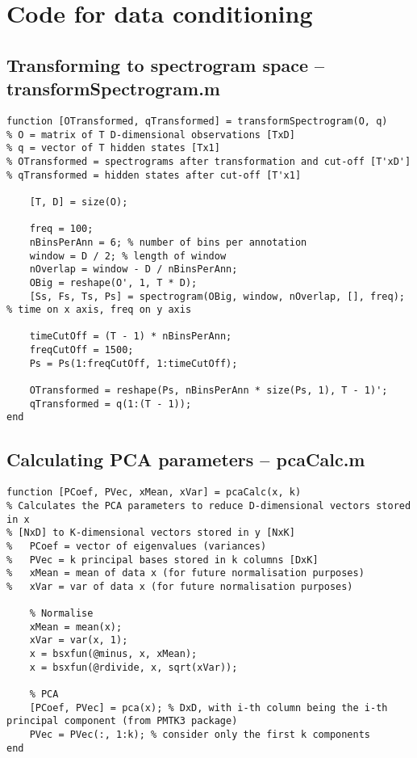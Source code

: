 \chapter{Code for data conditioning}
\label{ch:dataConditioningCode}

\section{Transforming to spectrogram space -- transformSpectrogram.m}
\label{sec:transformSpectrogram}
\begin{lstlisting}
function [OTransformed, qTransformed] = transformSpectrogram(O, q)
% O = matrix of T D-dimensional observations [TxD]
% q = vector of T hidden states [Tx1]
% OTransformed = spectrograms after transformation and cut-off [T'xD']
% qTransformed = hidden states after cut-off [T'x1]

    [T, D] = size(O);

    freq = 100;
    nBinsPerAnn = 6; % number of bins per annotation
    window = D / 2; % length of window
    nOverlap = window - D / nBinsPerAnn;
    OBig = reshape(O', 1, T * D);
    [Ss, Fs, Ts, Ps] = spectrogram(OBig, window, nOverlap, [], freq); % time on x axis, freq on y axis
    
    timeCutOff = (T - 1) * nBinsPerAnn;
    freqCutOff = 1500;
    Ps = Ps(1:freqCutOff, 1:timeCutOff);

    OTransformed = reshape(Ps, nBinsPerAnn * size(Ps, 1), T - 1)';
    qTransformed = q(1:(T - 1));
end
\end{lstlisting}

\section{Calculating PCA parameters -- pcaCalc.m}
\label{sec:pcaCalc}
\begin{lstlisting}
function [PCoef, PVec, xMean, xVar] = pcaCalc(x, k)
% Calculates the PCA parameters to reduce D-dimensional vectors stored in x
% [NxD] to K-dimensional vectors stored in y [NxK]
%   PCoef = vector of eigenvalues (variances)
%   PVec = k principal bases stored in k columns [DxK]
%   xMean = mean of data x (for future normalisation purposes)
%   xVar = var of data x (for future normalisation purposes)
    
    % Normalise
    xMean = mean(x);
    xVar = var(x, 1);
    x = bsxfun(@minus, x, xMean);
    x = bsxfun(@rdivide, x, sqrt(xVar));
    
    % PCA
    [PCoef, PVec] = pca(x); % DxD, with i-th column being the i-th principal component (from PMTK3 package)
    PVec = PVec(:, 1:k); % consider only the first k components
end
\end{lstlisting}


